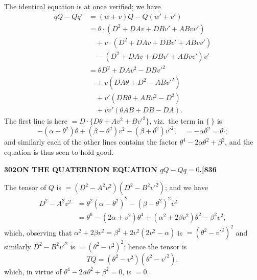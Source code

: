 \documentclass[12pt,a4paper]{article}
\theoremstyle{definition}
\begin{document}
The identical equation is at once verified; we have
\begin{align*}
qQ - Qq' &= (w + v)Q - Q(w' + v') \\
&= \theta \cdot (D^2 + DAv + DBv' + ABvv') \\
&\quad + v \cdot (D^2 + DAv + DBv' + ABvv') \\
&\quad - (D^2 + DAv + DBv' + ABvv') v' \\
&= \theta D^2 + DAv^2 - DBv'^2 \\
&\quad + v(DA\theta + D^2 - ABv'^2) \\
&\quad + v'(DB\theta + ABv^2 - D^2) \\
&\quad + vv'(\theta AB + DB - DA).
\end{align*}
The first line is here $= D \cdot \{D\theta + Av^2 + Bv'^2\}$, viz.\ the term in $\{\ \}$ is
\[
-(\alpha - \theta^2)\theta + (\beta - \theta^2)v^2 - (\beta + \theta^2)v'^2, \quad = -\alpha\theta^2 = \theta \cdot ;
\]
and similarly each of the other lines contains the factor $\theta^4 - 2\alpha\theta^2 + \beta^2$, and the equation is thus seen to hold good.

\newpage
\setcounter{page}{302}

\noindent\textbf{302}\hfill\textbf{ON THE QUATERNION EQUATION $qQ - Qq = 0$.}\hfill\textbf{[836}

\bigskip

\noindent The tensor of $Q$ is $= (D^2 - A^2v^2)(D^2 - B^2v'^2)$; and we have
\begin{align*}
D^2 - A^2v^2 &= \theta^2(\alpha - \theta^2)^2 - (\beta - \theta^2)^2 v^2 \\
&= \theta^6 - (2\alpha + v^2)\theta^4 + (\alpha^2 + 2\beta v^2)\theta^2 - \beta^2 v^2,
\end{align*}
which, observing that $\alpha^2 + 2\beta v^2 = \beta^2 + 2v^2(2v^2 - \alpha)$ is $= (\theta^2 - v'^2)^2$ and similarly $D^2 - B^2v'^2$ is $= (\theta^2 - v^2)^2$; hence the tensor is
\[
TQ = (\theta^2 - v^2)(\theta^2 - v'^2),
\]
which, in virtue of $\theta^4 - 2\alpha\theta^2 + \beta^2 = 0$, is $= 0$.
\end{document}
